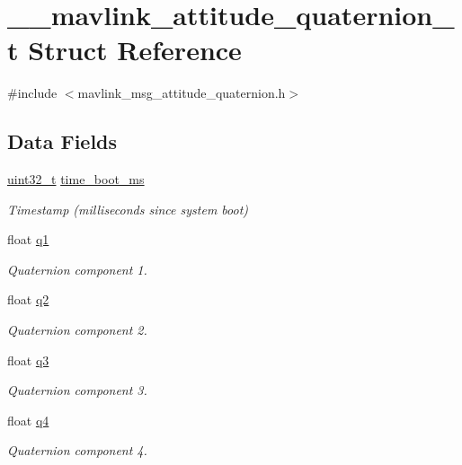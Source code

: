 \hypertarget{struct____mavlink__attitude__quaternion__t}{\section{\-\_\-\-\_\-mavlink\-\_\-attitude\-\_\-quaternion\-\_\-t Struct Reference}
\label{struct____mavlink__attitude__quaternion__t}
}


{\ttfamily \#include $<$mavlink\-\_\-msg\-\_\-attitude\-\_\-quaternion.\-h$>$}

\subsection*{Data Fields}
\begin{DoxyCompactItemize}
\item 
\hyperlink{stdint_8h_a435d1572bf3f880d55459d9805097f62}{uint32\-\_\-t} \hyperlink{struct____mavlink__attitude__quaternion__t_af6846c94b303788cf54d7861a939ab15}{time\-\_\-boot\-\_\-ms}
\begin{DoxyCompactList}\small\item\em Timestamp (milliseconds since system boot) \end{DoxyCompactList}\item 
float \hyperlink{struct____mavlink__attitude__quaternion__t_a54fd7b1cca2ab5e1b800bef5c7014b17}{q1}
\begin{DoxyCompactList}\small\item\em Quaternion component 1. \end{DoxyCompactList}\item 
float \hyperlink{struct____mavlink__attitude__quaternion__t_ad6451d99fa8f80bba96a47b3c2408255}{q2}
\begin{DoxyCompactList}\small\item\em Quaternion component 2. \end{DoxyCompactList}\item 
float \hyperlink{struct____mavlink__attitude__quaternion__t_a6ea5423090526626cf04041c929703d5}{q3}
\begin{DoxyCompactList}\small\item\em Quaternion component 3. \end{DoxyCompactList}\item 
float \hyperlink{struct____mavlink__attitude__quaternion__t_a4c78a9e744406f980fab7ff67613b14d}{q4}
\begin{DoxyCompactList}\small\item\em Quaternion component 4. \end{DoxyCompactList}\item 

\end{DoxyCompactItemize}
